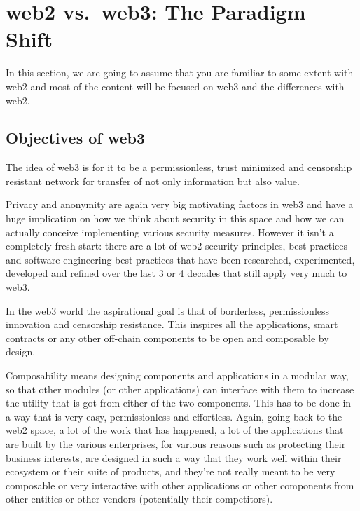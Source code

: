 \section{web2 vs.~web3: The Paradigm
Shift}\label{web2-vs.-web3-the-paradigm-shift}

In this section, we are going to assume that you are familiar to some
extent with web2 and most of the content will be focused on web3 and the
differences with web2.

\subsection{Objectives of web3}\label{objectives-of-web3}

The idea of web3 is for it to be a permissionless, trust minimized and
censorship resistant network for transfer of not only information but
also value.

Privacy and anonymity are again very big motivating factors in web3 and
have a huge implication on how we think about security in this space and
how we can actually conceive implementing various security measures.
However it isn't a completely fresh start: there are a lot of web2
security principles, best practices and software engineering best
practices that have been researched, experimented, developed and refined
over the last 3 or 4 decades that still apply very much to web3.

In the web3 world the aspirational goal is that of borderless,
permissionless innovation and censorship resistance. This inspires all
the applications, smart contracts or any other off-chain components to
be open and composable by design.

Composability means designing components and applications in a modular
way, so that other modules (or other applications) can interface with
them to increase the utility that is got from either of the two
components. This has to be done in a way that is very easy,
permissionless and effortless. Again, going back to the web2 space, a
lot of the work that has happened, a lot of the applications that are
built by the various enterprises, for various reasons such as protecting
their business interests, are designed in such a way that they work well
within their ecosystem or their suite of products, and they're not
really meant to be very composable or very interactive with other
applications or other components from other entities or other vendors
(potentially their competitors).

